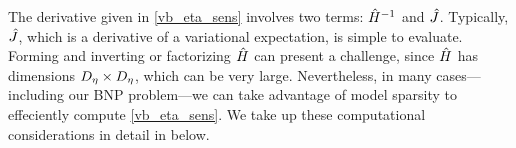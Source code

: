 The derivative given in \eqref{vb_eta_sens} involves two terms: $\hat{H}^{-1}$
and  $\hat J$.  Typically, $\hat J$, which is a derivative of a
variational expectation, is simple to evaluate.  Forming and inverting or
factorizing $\hat{H}$ can present a challenge, since $\hat{H}$ has dimensions
${D_{\eta}} \times {D_{\eta}}$, which can be very large.  Nevertheless, in many
cases---including our BNP problem---we can take advantage of model sparsity to
effeciently compute \eqref{vb_eta_sens}.  We take up these computational
considerations in detail in  below.
